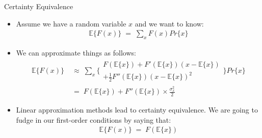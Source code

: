 \documentclass[10pt,c,aspectratio=1610,handout]{beamer}
\begin{document}
\begin{frame}{Certainty Equivalence}%
  \begin{itemize}%
    \item[$\blacktriangleright$] Assume we have a random variable $x$ and we want to know:%
    \begin{align*}%
      \mathbb{E} \Big\{ F(x) \Big\} \; = \; \sum_{x} F(x) Pr\{x\}%
    \end{align*}%
    \pause%
    \item[$\blacktriangleright$] We can approximate things as follows:%
    \begin{align*}%
      \mathbb{E} \Big\{ F(x) \Big\} & \; \approx \; \sum_x \Bigg\{%
      \begin{array}{c}%
        F(\mathbb{E} \{x\} ) + F'(\mathbb{E} \{x\} )  (x - \mathbb{E} \{x\} ) \\%
        + \frac{1}{2}F''(\mathbb{E} \{x\} ) (x - \mathbb{E} \{x\} )^2%
      \end{array}%
      \Bigg \} Pr\{x\} \\%
      & \; = \; F(\mathbb{E} \{x\}) + F''(\mathbb{E} \{x\}) \times \frac{\sigma_x^2}{2}%
    \end{align*}%
    \pause%
    \item[$\blacktriangleright$] Linear approximation methods lead to certainty equivalence. We are going to fudge in our first-order conditions by saying that:%
    \begin{align*}%
      \mathbb{E} \Big\{ F(x) \Big\} \; = \; F( \mathbb{E} \{x\} )%
    \end{align*}%
  \end{itemize}%
\end{frame}%
\end{document}
